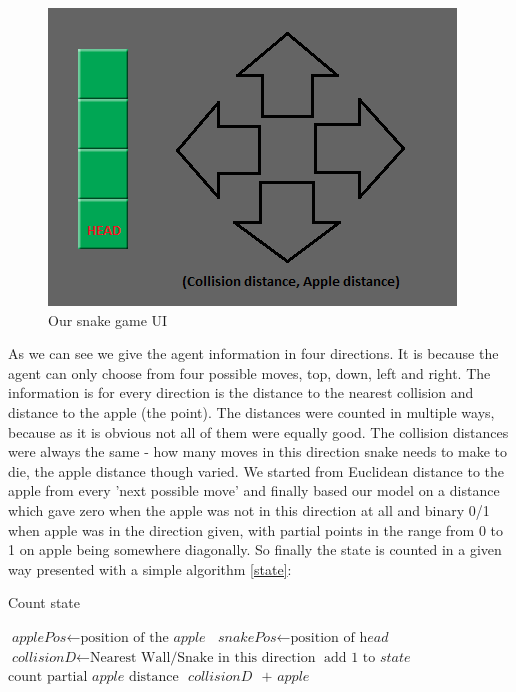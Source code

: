 \documentclass[]{article}
\begin{document}
\begin{figure}[h]
	\centering
	\includegraphics[scale=0.6]{snakeenv}
	\caption{Our snake game UI}
	\label{fig:snakeenv}
\end{figure}

\par As we can see we give the agent information in four directions. It is because the agent can only choose from four possible moves, top, down, left and right. The information is for every direction is the distance to the nearest collision and distance to the apple (the point). The distances were counted in multiple ways, because as it is obvious not all of them were equally good. The collision distances were always the same - how many moves in this direction snake needs to make to die, the apple distance though varied. We started from Euclidean distance to the apple from every 'next possible move' and finally based our model on a distance which gave zero when the apple was not in this direction at all and binary 0/1 when apple was in the direction given, with partial points in the range from 0 to 1 on apple being somewhere diagonally. So finally the state is counted in a given way presented with a simple algorithm \ref{state}:


\begin{algorithm}	
	\caption{Count state}\label{euclid}	
	\begin{algorithmic}[1]
		\State $\textit{applePos} \gets \text{position of the }\textit{apple}$
		\State $\textit{snakePos} \gets \text{position of }\textit{head}$
		\State $\textit{collisionD} \gets \text{Nearest Wall/Snake in this direction}$
		\EndFor
		\State $\text{add 1 to }\textit{state}$
		\EndIf
		\EndFor
		\State $\text{count partial } \textit{apple} \text{ distance }$
		\EndIf
		\Return $\textit{collisionD }\text{ + }\textit{apple}$
		\EndProcedure
	\end{algorithmic}
\end{algorithm}
\end{document}
